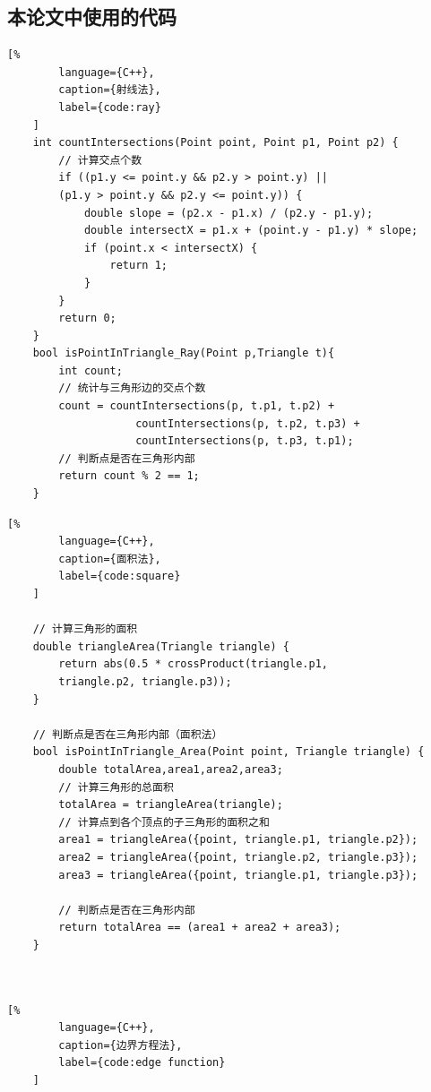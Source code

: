 \cleardoublepage

{

    \appendixsubsecmajornumbering

    \subsection{本论文中使用的代码}

    \begin{lstlisting}[%
        language={C++},
        caption={射线法},
        label={code:ray}
    ]
    int countIntersections(Point point, Point p1, Point p2) {
        // 计算交点个数
        if ((p1.y <= point.y && p2.y > point.y) || 
        (p1.y > point.y && p2.y <= point.y)) {
            double slope = (p2.x - p1.x) / (p2.y - p1.y);
            double intersectX = p1.x + (point.y - p1.y) * slope;
            if (point.x < intersectX) {
                return 1;
            }
        }
        return 0;
    }
    bool isPointInTriangle_Ray(Point p,Triangle t){
        int count;
        // 统计与三角形边的交点个数
        count = countIntersections(p, t.p1, t.p2) +
                    countIntersections(p, t.p2, t.p3) +
                    countIntersections(p, t.p3, t.p1);
        // 判断点是否在三角形内部
        return count % 2 == 1;
    }
    \end{lstlisting}
    \begin{lstlisting}[%
        language={C++},
        caption={面积法},
        label={code:square}
    ]
    
    // 计算三角形的面积
    double triangleArea(Triangle triangle) {
        return abs(0.5 * crossProduct(triangle.p1, 
        triangle.p2, triangle.p3));
    }
    
    // 判断点是否在三角形内部（面积法）
    bool isPointInTriangle_Area(Point point, Triangle triangle) {
        double totalArea,area1,area2,area3;
        // 计算三角形的总面积
        totalArea = triangleArea(triangle);
        // 计算点到各个顶点的子三角形的面积之和
        area1 = triangleArea({point, triangle.p1, triangle.p2});
        area2 = triangleArea({point, triangle.p2, triangle.p3});
        area3 = triangleArea({point, triangle.p1, triangle.p3});
    
        // 判断点是否在三角形内部
        return totalArea == (area1 + area2 + area3);
    }
    
    
    \end{lstlisting}

    
    \begin{lstlisting}[%
        language={C++},
        caption={边界方程法},
        label={code:edge function}
    ]
    

\end{lstlisting}}
